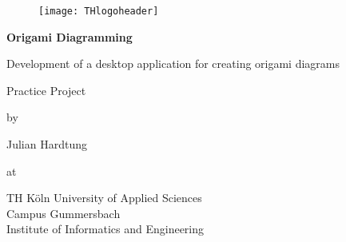 
\begin{titlepage}
	\begin{center}
	
		\begin{figure}[!htbp]
			\texttt{[image: THlogoheader]}
		\end{figure}
		
		\vspace{0.8cm}
		
		\begin{rmfamily}
			\begin{huge}
				\textbf{Origami Diagramming}\\
			\end{huge}
			\vspace{0.5cm}
			\begin{LARGE}
				Development of a desktop application for creating 
				origami diagrams\\
			\end{LARGE}
		\end{rmfamily}
		
		\vspace{1.5cm}
		
		\begin{LARGE}
			\begin{scshape}
				Practice Project\\[0.8em]
			\end{scshape}
		\end{LARGE}
		
		\begin{large}
			by\\
			\begin{LARGE}
				Julian Hardtung\\
			\end{LARGE}
		\end{large}
		
		\vfill
		
		\begin{large}
			at\\
			\vspace{0.2cm}
			\begin{scshape}
				TH Köln University of Applied Sciences\\
				Campus Gummersbach\\
				Institute of Informatics and Engineering
			\end{scshape}
		\end{large}
		

\end{center}
\end{titlepage}
